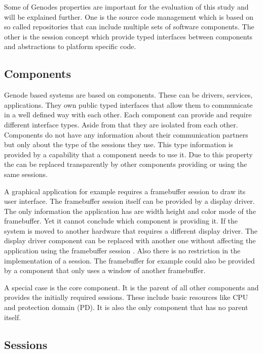 \documentclass[
a4paper,
11pt,
twoside
]{report}
\begin{document}
		Some of Genodes properties are important for the evaluation of this study and will be explained further.
		One is the source code management which is based on so called repositories that can include multiple sets of software components.
		The other is the session concept which provide typed interfaces between components and abstractions to platform specific code.
		
		\subsection{Components}
		
		Genode based systems are based on components.
		These can be drivers, services, applications.
		They own public typed interfaces that allow them to communicate in a well defined way with each other.
		Each component can provide and require different interface types.
		Aside from that they are isolated from each other.
		Components do not have any information about their communication partners but only about the type of the sessions they use.
		This type information is provided by a capability that a component needs to use it.
		Due to this property the can be replaced transparently by other components providing or using the same sessions. \citep{genode}
		
		A graphical application for example requires a framebuffer session to draw its user interface.
		The framebuffer session itself can be provided by a display driver.
		The only information the application has are width height and color mode of the framebuffer.
		Yet it cannot conclude which component is providing it.
		If the system is moved to another hardware that requires a different display driver.
		The display driver component can be replaced with another one without affecting the application using the framebuffer session \citep{genode}.
		Also there is no restriction in the implementation of a session.
		The framebuffer for example could also be provided by a component that only uses a window of another framebuffer.
		
		A special case is the core component.
		It is the parent of all other components and provides the initially required sessions.
		These include basic resources like CPU and protection domain  (PD).
		It is also the only component that has no parent itself. \citep{genode}
		
		\subsection{Sessions}
		\label{sessions}
		
\end{document}
